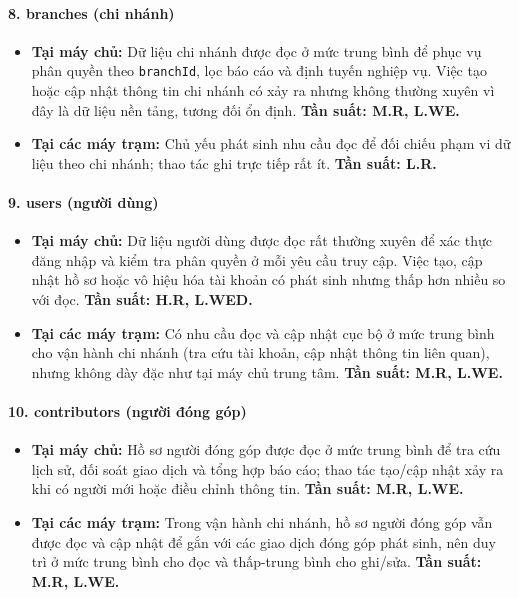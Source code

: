\documentclass[12pt,a4paper]{article}
\begin{document}
\paragraph{8. branches (chi nhánh)} \mbox{}
\begin{itemize}
    \item \textbf{Tại máy chủ:} Dữ liệu chi nhánh được đọc ở mức trung bình để phục vụ phân quyền theo \texttt{branchId}, lọc báo cáo và định tuyến nghiệp vụ. Việc tạo hoặc cập nhật thông tin chi nhánh có xảy ra nhưng không thường xuyên vì đây là dữ liệu nền tảng, tương đối ổn định. \textbf{Tần suất: M.R, L.WE.}
    \item \textbf{Tại các máy trạm:} Chủ yếu phát sinh nhu cầu đọc để đối chiếu phạm vi dữ liệu theo chi nhánh; thao tác ghi trực tiếp rất ít. \textbf{Tần suất: L.R.}
\end{itemize}

\paragraph{9. users (người dùng)} \mbox{}
\begin{itemize}
    \item \textbf{Tại máy chủ:} Dữ liệu người dùng được đọc rất thường xuyên để xác thực đăng nhập và kiểm tra phân quyền ở mỗi yêu cầu truy cập. Việc tạo, cập nhật hồ sơ hoặc vô hiệu hóa tài khoản có phát sinh nhưng thấp hơn nhiều so với đọc. \textbf{Tần suất: H.R, L.WED.}
    \item \textbf{Tại các máy trạm:} Có nhu cầu đọc và cập nhật cục bộ ở mức trung bình cho vận hành chi nhánh (tra cứu tài khoản, cập nhật thông tin liên quan), nhưng không dày đặc như tại máy chủ trung tâm. \textbf{Tần suất: M.R, L.WE.}
\end{itemize}

\paragraph{10. contributors (người đóng góp)} \mbox{}
\begin{itemize}
    \item \textbf{Tại máy chủ:} Hồ sơ người đóng góp được đọc ở mức trung bình để tra cứu lịch sử, đối soát giao dịch và tổng hợp báo cáo; thao tác tạo/cập nhật xảy ra khi có người mới hoặc điều chỉnh thông tin. \textbf{Tần suất: M.R, L.WE.}
    \item \textbf{Tại các máy trạm:} Trong vận hành chi nhánh, hồ sơ người đóng góp vẫn được đọc và cập nhật để gắn với các giao dịch đóng góp phát sinh, nên duy trì ở mức trung bình cho đọc và thấp-trung bình cho ghi/sửa. \textbf{Tần suất: M.R, L.WE.}
\end{itemize}
\clearpage
\end{document}
